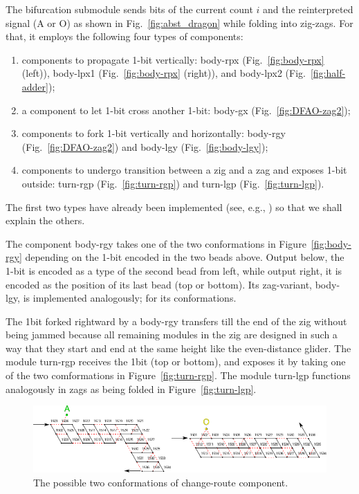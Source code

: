The bifurcation submodule sends bits of the current count $i$ and the reinterpreted signal (A or O) as shown in Fig.~\ref{fig:abst_dragon} while folding into zig-zags.
For that, it employs the following four types of components: 
\begin{enumerate}[itemsep=0pt]
\item components to propagate 1-bit vertically: body-rpx (Fig.~\ref{fig:body-rpx} (left)), body-lpx1 (Fig.~\ref{fig:body-rpx} (right)), and body-lpx2 (Fig.~\ref{fig:half-adder});
\item a component to let 1-bit cross another 1-bit: body-gx (Fig.~\ref{fig:DFAO-zag2}); 
\item components to fork 1-bit vertically and horizontally: body-rgy (Fig.~\ref{fig:DFAO-zag2}) and body-lgy (Fig.~\ref{fig:body-lgy});  
\item components to undergo transition between a zig and a zag and exposes 1-bit outside: turn-rgp (Fig.~\ref{fig:turn-rgp}) and turn-lgp (Fig.~\ref{fig:turn-lgp}). 
\end{enumerate} 
The first two types have already been implemented (see, e.g., \cite{HaKiOtSe2016}) so that we shall explain the others.

The component body-rgy takes one of the two conformations in Figure~\ref{fig:body-rgy} depending on the 1-bit encoded in the two beads above.
Output below, the 1-bit is encoded as a type of the second bead from left, while output right, it is encoded as the position of its last bead (top or bottom).
Its zag-variant, body-lgy, is implemented analogously; for its conformations.

The 1bit forked rightward by a body-rgy transfers till the end of the zig without being jammed because all remaining modules in the zig are designed in such a way that they start and end at the same height like the even-distance glider.
The module turn-rgp receives the 1bit (top or bottom), and exposes it by taking one of the two comformations in Figure~\ref{fig:turn-rgp}.
The module turn-lgp functions analogously in zags as being folded in Figure~\ref{fig:turn-lgp}.

\begin{figure}[h]
\centering
\includegraphics[width=\linewidth]{pic/change_route.pdf}
\caption{The possible two conformations of change-route component.}
\label{fig:change_route}
\end{figure}


